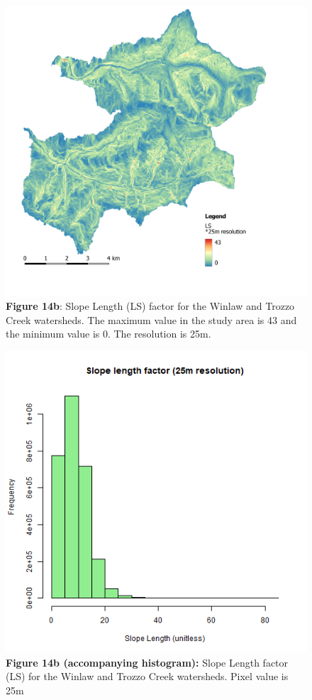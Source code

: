 \documentclass[
]{article}
\begin{document}
\begin{figure}
\centering
\includegraphics{img/LS_25m.png}
\caption{\textbf{Figure 14b}: Slope Length (LS) factor for the Winlaw and Trozzo Creek watersheds. The maximum value in the study area is 43 and the minimum value is 0. The resolution is 25m.}
\end{figure}

\begin{figure}
\centering
\includegraphics{img/LS_25m_hist.png}
\caption{\textbf{Figure 14b (accompanying histogram):} Slope Length factor (LS) for the Winlaw and Trozzo Creek watersheds. Pixel value is 25m}
\end{figure}
\end{document}
